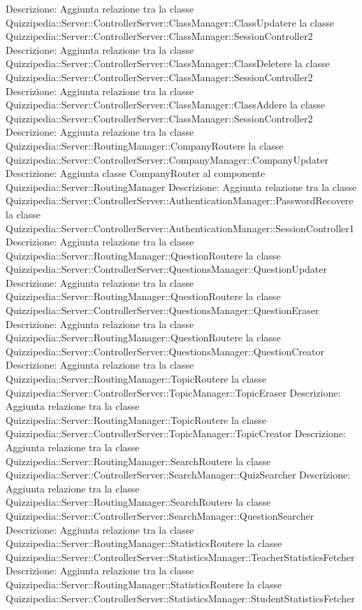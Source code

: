 Descrizione: Aggiunta relazione tra la classe Quizzipedia::Server::ControllerServer::ClassManager::ClassUpdatere la classe Quizzipedia::Server::ControllerServer::ClassManager::SessionController2 
Descrizione: Aggiunta relazione tra la classe Quizzipedia::Server::ControllerServer::ClassManager::ClassDeletere la classe Quizzipedia::Server::ControllerServer::ClassManager::SessionController2 
Descrizione: Aggiunta relazione tra la classe Quizzipedia::Server::ControllerServer::ClassManager::ClassAddere la classe Quizzipedia::Server::ControllerServer::ClassManager::SessionController2 
Descrizione: Aggiunta relazione tra la classe Quizzipedia::Server::RoutingManager::CompanyRoutere la classe Quizzipedia::Server::ControllerServer::CompanyManager::CompanyUpdater 
Descrizione: Aggiunta classe CompanyRouter al componente Quizzipedia::Server::RoutingManager 
Descrizione: Aggiunta relazione tra la classe Quizzipedia::Server::ControllerServer::AuthenticationManager::PasswordRecovere la classe Quizzipedia::Server::ControllerServer::AuthenticationManager::SessionController1 
Descrizione: Aggiunta relazione tra la classe Quizzipedia::Server::RoutingManager::QuestionRoutere la classe Quizzipedia::Server::ControllerServer::QuestionsManager::QuestionUpdater 
Descrizione: Aggiunta relazione tra la classe Quizzipedia::Server::RoutingManager::QuestionRoutere la classe Quizzipedia::Server::ControllerServer::QuestionsManager::QuestionEraser 
Descrizione: Aggiunta relazione tra la classe Quizzipedia::Server::RoutingManager::QuestionRoutere la classe Quizzipedia::Server::ControllerServer::QuestionsManager::QuestionCreator 
Descrizione: Aggiunta relazione tra la classe Quizzipedia::Server::RoutingManager::TopicRoutere la classe Quizzipedia::Server::ControllerServer::TopicManager::TopicEraser 
Descrizione: Aggiunta relazione tra la classe Quizzipedia::Server::RoutingManager::TopicRoutere la classe Quizzipedia::Server::ControllerServer::TopicManager::TopicCreator 
Descrizione: Aggiunta relazione tra la classe Quizzipedia::Server::RoutingManager::SearchRoutere la classe Quizzipedia::Server::ControllerServer::SearchManager::QuizSearcher 
Descrizione: Aggiunta relazione tra la classe Quizzipedia::Server::RoutingManager::SearchRoutere la classe Quizzipedia::Server::ControllerServer::SearchManager::QuestionSearcher 
Descrizione: Aggiunta relazione tra la classe Quizzipedia::Server::RoutingManager::StatisticsRoutere la classe Quizzipedia::Server::ControllerServer::StatisticsManager::TeacherStatisticsFetcher 
Descrizione: Aggiunta relazione tra la classe Quizzipedia::Server::RoutingManager::StatisticsRoutere la classe Quizzipedia::Server::ControllerServer::StatisticsManager::StudentStatisticsFetcher 
